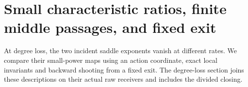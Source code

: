 \section{Small characteristic ratios, finite middle passages, and fixed exit}
\label{sec:small-characteristic-ratios}

At degree loss, the two incident saddle exponents vanish at different
rates. We compare their small-power maps using an action coordinate,
exact local invariants and backward shooting from a fixed exit. The
degree-loss section joins these descriptions on their actual raw
receivers and includes the divided closing.


